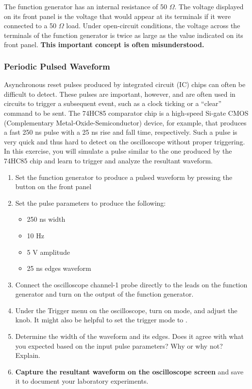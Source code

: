 \documentclass[12pt]{../manual}
\begin{document}
The function generator has an internal resistance of 50 $\Omega$. The voltage displayed on its front panel is the voltage that would appear at its terminals if it were connected to a 50 $\Omega$ load. Under open-circuit conditions, the voltage across the terminals of the function generator is twice as large as the value indicated on its front panel. \textbf{This important concept is often misunderstood.}

\subsubsection{Periodic Pulsed Waveform}
Asynchronous reset pulses produced by integrated circuit (IC) chips can often be difficult to detect.  These pulses are important, however, and are often used in circuits to trigger a subsequent event, such as a clock ticking or a ``clear'' command to be sent.  The 74HC85 comparator chip is a high-speed Si-gate CMOS (Complementary Metal-Oxide-Semiconductor) device, for example, that produces a fast 250 ns pulse with a 25 ns rise and fall time, respectively.   Such a pulse is very quick and thus hard to detect on the oscilloscope without proper triggering.  In this exercise, you will simulate a pulse similar to the one produced by the 74HC85 chip and learn to trigger and analyze the resultant waveform.

\begin{enumerate}
\item Set the function generator to produce a pulsed waveform by pressing the  button on the front panel
\item Set the pulse parameters to produce the following: 
\begin{itemize}
\item 250 ns width
\item 10 Hz
\item 5 V amplitude
\item 25 ns edges waveform
\end{itemize}
\item Connect the oscilloscope channel-1 probe directly to the leads on the function generator and turn on the output of the function generator.
\item Under the Trigger menu on the oscilloscope, turn on  mode, and adjust the  knob. It might also be helpful to set the trigger mode to  . 
\item Determine the width of the waveform and its edges. Does it agree with what you expected based on the input pulse parameters? Why or why not? Explain.
\item \textbf{Capture the resultant waveform on the oscilloscope screen} and save it to document your laboratory experiments.
\end{enumerate}
\end{document}
